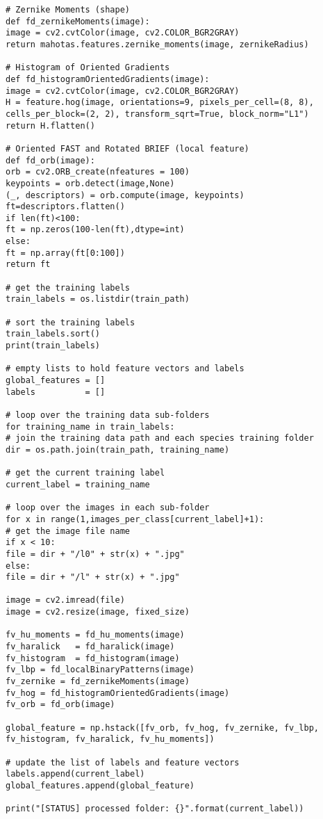 \documentclass{article}
\begin{document}
\begin{verbatim}
# Zernike Moments (shape)
def fd_zernikeMoments(image):
image = cv2.cvtColor(image, cv2.COLOR_BGR2GRAY)
return mahotas.features.zernike_moments(image, zernikeRadius)

# Histogram of Oriented Gradients
def fd_histogramOrientedGradients(image):
image = cv2.cvtColor(image, cv2.COLOR_BGR2GRAY)
H = feature.hog(image, orientations=9, pixels_per_cell=(8, 8),
cells_per_block=(2, 2), transform_sqrt=True, block_norm="L1")
return H.flatten()

# Oriented FAST and Rotated BRIEF (local feature)
def fd_orb(image):
orb = cv2.ORB_create(nfeatures = 100)
keypoints = orb.detect(image,None)
(_, descriptors) = orb.compute(image, keypoints)
ft=descriptors.flatten()
if len(ft)<100:
ft = np.zeros(100-len(ft),dtype=int)
else:
ft = np.array(ft[0:100])
return ft

# get the training labels
train_labels = os.listdir(train_path)

# sort the training labels
train_labels.sort()
print(train_labels)

# empty lists to hold feature vectors and labels
global_features = []
labels          = []

# loop over the training data sub-folders
for training_name in train_labels:
# join the training data path and each species training folder
dir = os.path.join(train_path, training_name)

# get the current training label
current_label = training_name

# loop over the images in each sub-folder
for x in range(1,images_per_class[current_label]+1):
# get the image file name
if x < 10:
file = dir + "/l0" + str(x) + ".jpg"
else:
file = dir + "/l" + str(x) + ".jpg"

image = cv2.imread(file)
image = cv2.resize(image, fixed_size)

fv_hu_moments = fd_hu_moments(image)
fv_haralick   = fd_haralick(image)
fv_histogram  = fd_histogram(image)
fv_lbp = fd_localBinaryPatterns(image)
fv_zernike = fd_zernikeMoments(image)
fv_hog = fd_histogramOrientedGradients(image)
fv_orb = fd_orb(image)

global_feature = np.hstack([fv_orb, fv_hog, fv_zernike, fv_lbp, fv_histogram, fv_haralick, fv_hu_moments])

# update the list of labels and feature vectors
labels.append(current_label)
global_features.append(global_feature)

print("[STATUS] processed folder: {}".format(current_label))


\end{verbatim}
\end{document}
